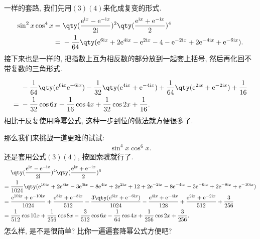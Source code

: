 \documentclass{ctexbook}
\newcommand{\e}{\mathrm{e}}
\newcommand{\im}{\mathrm{i}}
\begin{document}
{一样的套路, 我们先用$(3)(4)$来化成复变的形式. 
\begin{align*}
\sin^{2}{x}\cos^{4}{x}={}&\qty(\frac{\e^{\im x}-\e^{-\im x}}{2\im})^{2}\qty(\frac{\e^{\im x}+\e^{-\im x}}{2})^{4}\\
={}&-\frac{1}{64}\qty(\e^{6\im x}+2\e^{4\im x}-\e^{2\im x}-4-\e^{-2\im x}+2\e^{-4\im x}+\e^{-6\im x})
.\end{align*}
接下来也是一样的, 把指数上互为相反数的部分放到一起套上括号, 然后再化回不带复数的三角形式. \par
\begin{align*}
{}&-\frac{1}{64}\qty(\e^{6\im x}\e^{-6\im x})-\frac{1}{32}\qty(\e^{4\im x}+\e^{-4\im x})+\frac{1}{64}\qty(\e^{2\im x}+\e^{-2\im x})+\frac{1}{16}\\
={}&-\frac{1}{32}\cos{6x}-\frac{1}{16}\cos{4x}+\frac{1}{32}\cos{2x}+\frac{1}{16}
.\end{align*}
相比于反复使用降幂公式, 这种一步到位的做法就方便很多了. \par
那么我们来挑战一道更难的试试: 
\begin{align*}
\sin^{4}{x}\cos^{6}{x}
.\end{align*}
还是套用公式$(3)(4)$, 按图索骥就行了. 
\begin{align*}
{}&\qty(\frac{\e^{\im x}-\e^{-\im x}}{2\im})^{4}\qty(\frac{\e^{\im x}+\e^{-\im x}}{2})^{6}\\
={}&\frac{1}{1024}\qty(\e^{10\im x}+2\e^{8\im x}-3\e^{6\im x}-8\e^{4\im x}+2\e^{2\im x}+12+2\e^{-2\im x}-8\e^{-4\im x}-3\e^{-6\im x}+2\e^{-8\im x}+\e^{-10\im x})\\
={}&\frac{\e^{10\im x}+\e^{-10\im x}}{1024}+\frac{\e^{8\im x}+\e^{-8\im x}}{512}-\frac{3\qty(\e^{6\im x}+\e^{-6\im x})}{1024}-\frac{\e^{4\im x}+\e^{-4\im x}}{128}+\frac{\e^{2\im x}+\e^{-2\im x}}{512}+\frac{3}{256}\\
={}&\frac{1}{512}\cos{10x}+\frac{1}{256}\cos{8x}-\frac{3}{512}\cos{6x}-\frac{1}{64}\cos{4x}+\frac{1}{256}\cos{2x}+\frac{3}{256}
.\end{align*}
怎么样, 是不是很简单? 比你一遍遍套降幂公式方便吧? \par
}
\end{document}

